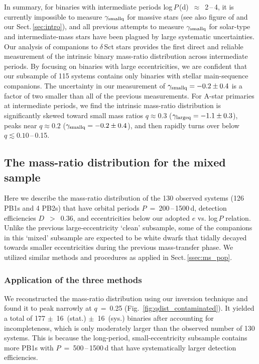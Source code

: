 \documentclass[a4paper,fleqn,usenatbib]{mnras}
\begin{document}
In summary, for binaries with intermediate periods log\,$P$\,(d)~$\approx$~2\,--\,4, it is currently impossible to measure $\gamma_{\rm smallq}$ for massive stars (see also figure of \citealt{moe&distefano2017} and our Sect.\,\ref{sec:intro}), and all previous attempts to measure $\gamma_{\rm smallq}$ for solar-type and intermediate-mass stars have been plagued by large systematic uncertainties. Our analysis of companions to $\delta$\,Sct stars provides the first direct and reliable measurement of the intrinsic binary mass-ratio distribution across intermediate periods. By focusing on binaries with large eccentricities, we are confident that our subsample of 115 systems contains only binaries with stellar main-sequence companions. The uncertainty in our measurement of \mbox{$\gamma_{\rm smallq} = -0.2\pm0.4$} is a factor of two smaller than all of the previous measurements. For A-star primaries at intermediate periods, we find the intrinsic mass-ratio distribution is significantly skewed toward small mass ratios $q \approx 0.3$ \mbox{($\gamma_{\rm largeq} = -1.1 \pm 0.3$)}, peaks near $q \approx 0.2$ \mbox{($\gamma_{\rm smallq} = -0.2 \pm 0.4$)}, and then rapidly turns over below \mbox{$q \lesssim 0.10$\,--\,0.15}.



\subsection{The mass-ratio distribution for the mixed sample}


Here we describe the mass-ratio distribution of the 130 observed systems (126 PB1s and 4 PB2s) that have orbital periods $P$~=~200\,--\,1500\,d, detection efficiencies $D$~$>$~0.36, and eccentricities below our adopted $e$ vs. log\,$P$ relation.  Unlike the previous large-eccentricity `clean' subsample, some of the companions in this `mixed' subsample are expected to be white dwarfs that tidally decayed towards smaller eccentricities during the previous mass-transfer phase.  We utilized similar methods and procedures as applied in Sect.\,\ref{ssec:ms_pop}.


\subsubsection{Application of the three methods}


We reconstructed the mass-ratio distribution using our inversion technique and found it to peak narrowly at $q$~=~0.25 (Fig.~\ref{fig:qdist_contaminated}). It yielded a total of 177 $\pm$~16~(stat.) $\pm$~16~(sys.) binaries after accounting for incompleteness, which is only moderately larger than the observed number of 130 systems. This is because the long-period, small-eccentricity subsample contains more PB1s with $P$~=~500\,--\,1500\,d that have systematically larger detection efficiencies.  
\end{document}
